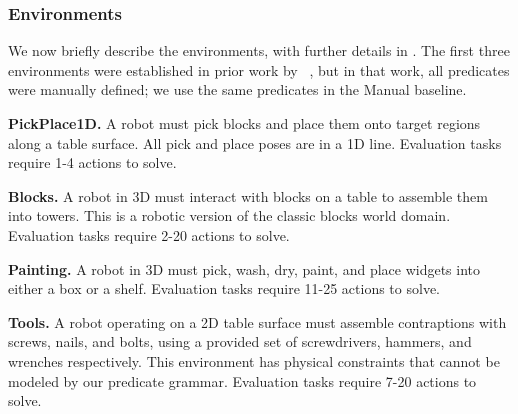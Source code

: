 \subsubsection{Environments} We now briefly describe the environments, with further details in . The first three environments were established in prior work by ~\citet{silver2021learning}, but in that work, all predicates were manually defined; we use the same predicates in the Manual baseline.
\begin{tightlist}
\item \textbf{PickPlace1D.} A robot must pick blocks and place them onto target regions along a table surface. All pick and place poses are in a 1D line. 
Evaluation tasks require 1-4 actions to solve.
\item \textbf{Blocks.} A robot in 3D must interact with blocks on a table to assemble them into towers. This is a robotic version of the classic blocks world domain.
Evaluation tasks require 2-20 actions to solve.
\item \textbf{Painting.} A robot in 3D must pick, wash, dry, paint, and place widgets into either a box or a shelf.
Evaluation tasks require 11-25 actions to solve.
\item \textbf{Tools.} A robot operating on a 2D table surface must assemble contraptions with screws, nails, and bolts, using a provided set of screwdrivers, hammers, and wrenches respectively. This environment has physical constraints that cannot be modeled by our predicate grammar.
Evaluation tasks require 7-20 actions to solve.
\end{tightlist}

